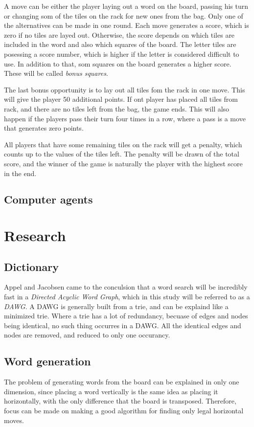 \documentclass[a4paper, 12pt]{report}
\begin{document}
A move can be either the player laying out a word on the board, passing his turn or changing som of the tiles on the rack for new ones from the bag. Only one of the alternatives can be made in one round. Each move generates a score, which is zero if no tiles are layed out. Otherwise, the score depends on which tiles are included in the word and also which squares of the board. The letter tiles are posessing a score number, which is higher if the letter is considered difficult to use. In addition to that, som squares on the board generates a higher score. These will be called \emph{bonus squares}. 

The last bonus opportunity is to lay out all tiles fom the rack in one move. This will give the player 50  additional points. If ont player has placed all tiles from rack, and there are no tiles left from the bag, the game ends. This will also happen if the players pass their turn four times in a row, where a pass is a move that generates zero points. 

All players that have some remaining tiles on the rack will get a penalty, which counts up to the values of the tiles left. The penalty will be drawn of the total score, and the winner of the game is naturally the player with the highest score in the end.

\subsection{Computer agents}
\section{Research}
\subsection{Dictionary}
Appel and Jacobsen \cite{fastest} came to the conculsion that a word search will be incredibly fast in a \emph{Directed Acyclic Word Graph}, which in this study will be referred to as a \emph{DAWG}. A DAWG is generally built from a trie, and can be explaind like a minimized trie. Where a trie has a lot of redundancy, becuase of edges and nodes being identical, no such thing occurres in a DAWG. All the identical edges and nodes are removed, and reduced to only one occurancy. 

\subsection{Word generation}
The problem of generating words from the board can be explained in only one dimension, since placing a word vertically is the same idea as placing it horizontally, with the only difference that the board is transposed. Therefore, focus can be made on making a good algorithm for finding only legal horizontal moves. 
\end{document}
